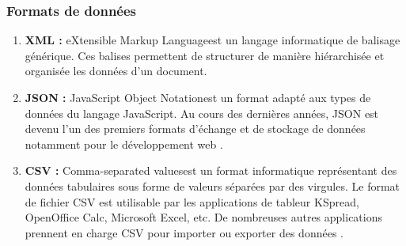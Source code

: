         \subsubsection{Formats de données}
            \begin{enumerate}[leftmargin=*]
                \item{\textbf{XML : }}
                \textquotedbl eXtensible Markup Language\textquotedbl est un langage informatique de balisage générique. Ces balises permettent de structurer de manière hiérarchisée et organisée les données d'un document.\\

                \item{\textbf{JSON : }}
                \textquotedbl JavaScript Object Notation\textquotedbl est un format adapté aux types de données du langage JavaScript. Au cours des dernières années, JSON est devenu l'un des premiers formats d'échange et de stockage de données notamment pour le développement web \cite{jsonimpl}.\\
                
                \item{\textbf{CSV : }}
                \textquotedbl Comma-separated values\textquotedbl est un format informatique représentant des données tabulaires sous forme de valeurs séparées par des virgules. Le format de fichier CSV est utilisable par les applications de tableur KSpread, OpenOffice Calc, Microsoft Excel, etc. De nombreuses autres applications prennent en charge CSV pour importer ou exporter des données \cite{csv}.
            \end{enumerate}

